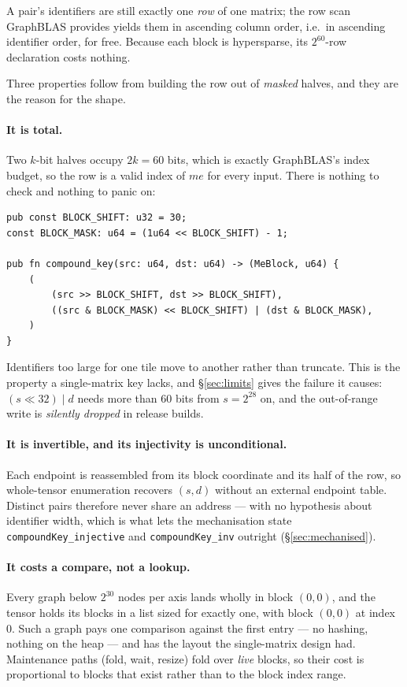 \documentclass[11pt,a4paper]{article}
\theoremstyle{plain}
\theoremstyle{definition}
\theoremstyle{remark}
\begin{document}
A pair's identifiers are still exactly one \emph{row} of one matrix; the row
scan GraphBLAS provides yields them in ascending column order, i.e.\ in
ascending identifier order, for free. Because each block is hypersparse, its
$2^{60}$-row declaration costs nothing.

Three properties follow from building the row out of \emph{masked} halves, and
they are the reason for the shape.

\paragraph{It is total.} Two $k$-bit halves occupy $2k = 60$ bits, which is
exactly GraphBLAS's index budget, so the row is a valid index of $me$ for every
input. There is nothing to check and nothing to panic on:

\begin{lstlisting}
pub const BLOCK_SHIFT: u32 = 30;
const BLOCK_MASK: u64 = (1u64 << BLOCK_SHIFT) - 1;

pub fn compound_key(src: u64, dst: u64) -> (MeBlock, u64) {
    (
        (src >> BLOCK_SHIFT, dst >> BLOCK_SHIFT),
        ((src & BLOCK_MASK) << BLOCK_SHIFT) | (dst & BLOCK_MASK),
    )
}
\end{lstlisting}

Identifiers too large for one tile move to another rather than truncate. This
is the property a single-matrix key lacks, and \S\ref{sec:limits} gives the
failure it causes: $(s \ll 32) \mathbin{|} d$ needs more than $60$ bits from
$s = 2^{28}$ on, and the out-of-range write is \emph{silently dropped} in
release builds.

\paragraph{It is invertible, and its injectivity is unconditional.} Each
endpoint is reassembled from its block coordinate and its half of the row, so
whole-tensor enumeration recovers $(s,d)$ without an external endpoint table.
Distinct pairs therefore never share an address --- with no hypothesis about
identifier width, which is what lets the mechanisation state
\texttt{compoundKey\_injective} and \texttt{compoundKey\_inv} outright
(\S\ref{sec:mechanised}).

\paragraph{It costs a compare, not a lookup.} Every graph below $2^{30}$ nodes
per axis lands wholly in block $(0,0)$, and the tensor holds its blocks in a
list sized for exactly one, with block $(0,0)$ at index $0$. Such a graph pays
one comparison against the first entry --- no hashing, nothing on the heap ---
and has the layout the single-matrix design had. Maintenance paths (fold, wait,
resize) fold over \emph{live} blocks, so their cost is proportional to blocks
that exist rather than to the block index range.
\end{document}
